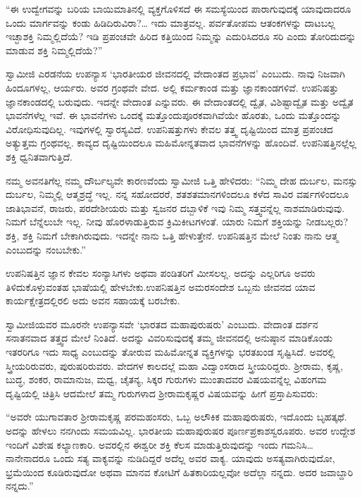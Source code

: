  “ಈ ಉದ್ವೇಗವನ್ನು ಬರಿಯ ಬಾಯಿಮಾತಿನಲ್ಲಿ ವ್ಯಕ್ತಗೊಳಿಸದೆ ಈ ಸಮಸ್ಯೆಯಿಂದ ಪಾರಾಗುವುದಕ್ಕೆ ಯಾವುದಾದರೂ ಒಂದು ಮಾರ್ಗವನ್ನು ಕಂಡು ಹಿಡಿದಿರುವಿರಾ?… ಇದು ಮಾತ್ರವಲ್ಲ. ಪರ್ವತೋಪಮ ಆತಂಕಗಳನ್ನು ದಾಟಬಲ್ಲ ಇಚ್ಛಾಶಕ್ತಿ ನಿಮ್ಮಲ್ಲಿದೆಯೆ? ಇಡಿ ಪ್ರಪಂಚವೇ ಹಿರಿದ ಕತ್ತಿಯಿಂದ ನಿಮ್ಮನ್ನು ಎದುರಿಸಿದರೂ ಸರಿ ಎಂದು ತೋರಿದುದನ್ನು ಮಾಡುವ ಶಕ್ತಿ ನಿಮ್ಮಲ್ಲಿದೆಯೆ?” 

 ಸ್ವಾಮೀಜಿ ಎರಡನೆಯ ಉಪನ್ಯಾಸ ‘ಭಾರತೀಯರ ಜೀವನದಲ್ಲಿ ವೇದಾಂತದ ಪ್ರಭಾವ’ ಎಂಬುದು. ನಾವು ನಿಜವಾಗಿ ಹಿಂದೂಗಳಲ್ಲ, ಆರ್ಯರು. ಅವರ ಗ್ರಂಥವೇ ವೇದ. ಅಲ್ಲಿ ಕರ್ಮಕಾಂಡ ಮತ್ತು ಜ್ಞಾನಕಾಂಡಗಳಿವೆ. ಉಪನಿಷತ್ತು ಜ್ಞಾನಕಾಂಡದಲ್ಲಿ ಬರುವುದು. ಇದನ್ನೇ ವೇದಾಂತ ಎನ್ನುವರು. ಈ ವೇದಾಂತದಲ್ಲಿ ದ್ವೈತ, ವಿಶಿಷ್ಟಾದ್ವೈತ ಮತ್ತು ಅದ್ವೈತ ಭಾವನೆಗಳೆಲ್ಲ ಇವೆ. ಈ ಭಾವನೆಗಳು ಒಂದಕ್ಕೆ ಮತ್ತೊಂದು\break ಪೂರಕವಾಗಿವೆಯೇ ಹೊರತು, ಒಂದು ಮತ್ತೊಂದನ್ನು ವಿರೋಧಿಸುವುದಿಲ್ಲ. ಇವುಗಳಲ್ಲಿ ಸ್ವಾರಸ್ಯವಿದೆ. ಉಪನಿಷತ್ತುಗಳು ಕೇವಲ ತತ್ತ್ವ ದೃಷ್ಟಿಯಿಂದ ಮಾತ್ರ ಪ್ರಪಂಚದ ಅತ್ಯುತ್ತಮ ಗ್ರಂಥವಲ್ಲ. ಕಾವ್ಯದ ದೃಷ್ಟಿಯಿಂದಲೂ ಮಹಿಮೋನ್ನತವಾದ ಭಾವನೆಗಳನ್ನು ಹೊಂದಿವೆ. ಉಪನಿಷತ್ತಿನಲ್ಲೆಲ್ಲ ಶಕ್ತಿ ಧ್ವನಿತವಾಗುತ್ತಿದೆ. 

 ನಮ್ಮ ಅವನತಿಗೆಲ್ಲ ನಮ್ಮ ದೌರ್ಬಲ್ಯವೇ ಕಾರಣವೆಂದು ಸ್ವಾಮೀಜಿ ಒತ್ತಿ ಹೇಳಿದರು: “ನಿಮ್ಮ ದೇಹ ದುರ್ಬಲ, ಮನಸ್ಸು ದುರ್ಬಲ, ನಿಮ್ಮಲ್ಲಿ ಆತ್ಮಶ್ರದ್ಧೆ ಇಲ್ಲ. ನನ್ನ ಸಹೋದರರೆ, ಶತಶತಮಾನಗಳಿಂದಲೂ ಕಳೆದ ಸಾವಿರ ವರ್ಷಗಳಿಂದಲೂ ಜಾತಿಭಾವನೆ, ರಾಜರು, ಪರದೇಶೀಯರು ಮತ್ತು ಸ್ವಜನರ ದಬ್ಬಾಳಿಕೆ ಇವು ನಿಮ್ಮ ಸತ್ತ್ವವನ್ನೆಲ್ಲ ನಾಶಮಾಡಿರುವುವು. ನಿಮಗೆ ಬೆನ್ನೆಲುಬೇ ಇಲ್ಲ. ನೀವು ಹೊರಳಾಡುತ್ತಿರುವ ಕ್ರಿಮಿಕೀಟಗಳಂತೆ. ಯಾರು ನಿಮಗೆ ಶಕ್ತಿಯನ್ನು ನೀಡಬಲ್ಲರು? ಶಕ್ತಿ, ಶಕ್ತಿ ನಿಮಗೆ ಬೇಕಾಗಿರುವುದು. ಇದನ್ನೇ ನಾನು ಒತ್ತಿ ಹೇಳುತ್ತೇನೆ. ಉಪನಿಷತ್ತಿನ ಮೇಲೆ ನಿಂತು ನಾನು ಆತ್ಮ ಎಂಬುದನ್ನು ನಂಬಬೇಕು.” 

 ಉಪನಿಷತ್ತಿನ ಜ್ಞಾನ ಕೇವಲ ಸಂನ್ಯಾಸಿಗಳು ಅಥವಾ ಪಂಡಿತರಿಗೆ ಮೀಸಲಲ್ಲ. ಅದನ್ನು ಎಲ್ಲರಿಗೂ ಅವರು ತಿಳಿದುಕೊಳ್ಳುವಂತಹ ಭಾಷೆಯಲ್ಲಿ ಹೇಳಬೇಕು.\break ಉಪನಿಷತ್ತಿನ ಅಮರಸಂದೇಶ ಒಬ್ಬನು ಜೀವನದ ಯಾವ ಕಾರ್ಯಕ್ಷೇತ್ರದಲ್ಲಿರಲಿ ಅದು ಅವನ ಸಹಾಯಕ್ಕೆ ಬರಬೇಕು. 

 ಸ್ವಾಮೀಜಿಯವರ ಮೂರನೇ ಉಪನ್ಯಾಸವೇ ‘ಭಾರತದ ಮಹಾಪುರುಷರು’ ಎಂಬುದು. ವೇದಾಂತ ದರ್ಶನ ಸನಾತನವಾದ ತತ್ತ್ವದ ಮೇಲೆ ನಿಂತಿದೆ. ಅದನ್ನು ವಿವರಿಸುವುದಕ್ಕೆ ತಮ್ಮ ಜೀವನದಲ್ಲಿ ಅನುಷ್ಠಾನ ಮಾಡಿಕೊಂಡು ಇತರರಿಗೂ ಇದು ಸಾಧ್ಯ ಎಂಬುದನ್ನು ತೋರುವ ಮಹಿಮೋನ್ನತ ವ್ಯಕ್ತಿಗಳನ್ನು ಭರತಖಂಡ ಸೃಷ್ಟಿಸಿದೆ. ಅವರಲ್ಲಿ ಸ್ತ್ರೀಯರಿರುವರು, ಪುರುಷರಿರುವರು. ವೇದಗಳ ಕಾಲದಲ್ಲೆ ಮಹಾ ವಿದ್ವಾಂಸರಾದ ಸ್ತ್ರೀಯರಿದ್ದರು. ಶ‍್ರೀರಾಮ, ಕೃಷ್ಣ, ಬುದ್ಧ, ಶಂಕರ, ರಾಮಾನುಜ, ಮಧ್ವ, ಚೈತನ್ಯ, ಸಿಕ್ಕರ ಗುರುಗಳು ಮುಂತಾದವರ ವಿಷಯವನ್ನೆಲ್ಲ ವಿಹಂಗಮ ದೃಷ್ಟಿಯಲ್ಲಿ ಚಿತ್ರಿಸಿ ಆದಮೇಲೆ ತಮ್ಮ ಗುರುಗಳಾದ ಶ‍್ರೀರಾಮಕೃಷ್ಣರ ವಿಷಯವನ್ನು ಹೀಗೆ ಪ್ರಸ್ತಾಪಿಸುವರು: 

 “ಅವರೇ ಯುಗಾವತಾರ ಶ‍್ರೀರಾಮಕೃಷ್ಣ ಪರಮಹಂಸರು, ಒಬ್ಬ ಅಲೌಕಿಕ ಮಹಾಪುರುಷರು, ಇದೊಂದು ಬೃಹತ್ಕಥೆ. ಅದನ್ನು ಹೇಳಲು ನನಗಿಂದು ಸಮಯವಿಲ್ಲ. ಭಾರತೀಯ ಮಹಾಪುರುಷರ ಪೂರ್ಣಪ್ರಕಾಶಸ್ವರೂಪರು. ಅವರ ಉದ್ದೇಶ ಇಂದಿಗೆ ವಿಶೇಷ ಕಲ್ಯಾಣಕಾರಿ. ಅವರಲ್ಲಿನ ಈಶ್ವರೀ ಶಕ್ತಿ ಕೆಲಸ ಮಾಡುತ್ತಿರುವುದನ್ನು ಇಂದು ಗಮನಿಸಿ… ನಾನೇನಾದರೂ ಒಂದು ಸತ್ಯ ವಾಕ್ಯವನ್ನು ನುಡಿದಿದ್ದರೆ ಅದೆಲ್ಲ ಅವರ ವಾಕ್ಯ. ಯಾವುದು ಅಸತ್ಯವಾಗಿರುವುದೋ, ಭ್ರಮೆಯಿಂದ ಕೂಡಿರುವುದೋ ಅಥವಾ ಮಾನವ ಕೋಟಿಗೆ ಹಿತಕಾರಿಯಲ್ಲವೋ ಅದೆಲ್ಲಾ ನನ್ನದು. ಅದರ ಜವಾಬ್ದಾರಿ ನನ್ನದು.” 

